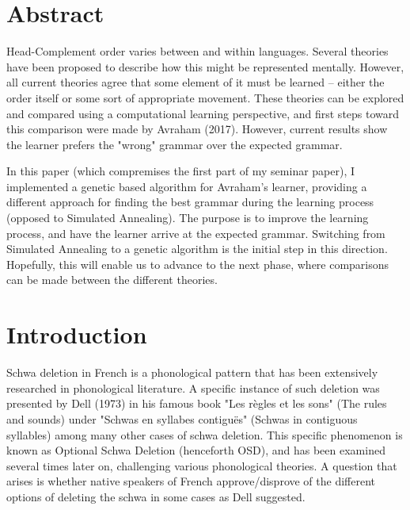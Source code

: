 \documentclass{article}
\begin{document}
\section*{Abstract}
{\sffamily\small

Head-Complement order varies between and within languages. Several theories have been proposed to describe how this might be represented mentally. However, all current theories agree that some element of it must be learned – either the order itself or some sort of appropriate movement.
These theories can be explored and compared using a computational learning perspective, and first steps toward this comparison were made by Avraham (2017). However, current results show the learner prefers the "wrong" grammar over the expected grammar.

In this paper (which compremises the first part of my seminar paper), I implemented a genetic based algorithm for Avraham's learner, providing a different approach for finding the best grammar during the learning process (opposed to Simulated Annealing).
The purpose is to improve the learning process, and have the learner arrive at the expected grammar.  Switching from Simulated Annealing to a genetic algorithm is the initial step in this direction.
Hopefully, this will enable us to advance to the next phase, where comparisons can be made between the different theories.
}

\section{Introduction} 
Schwa deletion in French is a phonological pattern that has been extensively researched in phonological literature. A specific instance of such deletion was presented by Dell (1973) in his famous book "Les règles et les sons" (The rules and sounds) under "Schwas en syllabes contiguës" (Schwas in contiguous syllables) among many other cases of schwa deletion. This specific phenomenon is known as Optional Schwa Deletion (henceforth OSD), and has been examined several times later on,  challenging various phonological theories. A question that arises is whether native speakers of French approve/disprove of the different options of deleting the schwa in some cases as Dell suggested.\\
\end{document}
